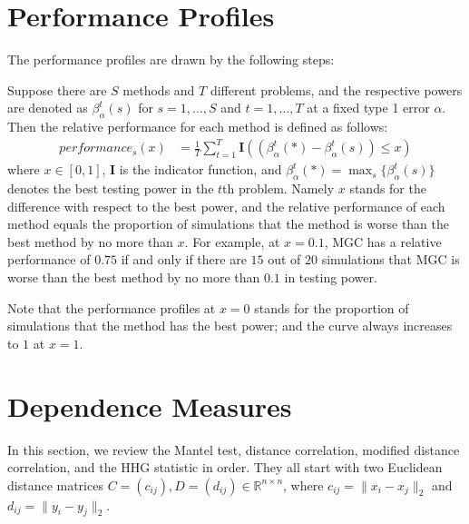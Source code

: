 \documentclass[11pt]{article}
\providecommand{\mb}[1]{\boldsymbol{#1}}
\newcommand{\Real}{\mathbb{R}}
\begin{document}
\section{Performance Profiles}
\label{appen:profiles}
The performance profiles are drawn by the following steps:

Suppose there are $S$ methods and $T$ different problems, and the respective powers are denoted as $\beta_{\alpha}^{t}(s)$ for $s=1,\ldots,S$ and $t=1,\ldots,T$ at a fixed type 1 error $\alpha$. Then the relative performance for each method is defined as follows:
\begin{align*}
performance_{s}(x) &= \frac{1}{T} \sum_{t=1}^{T} \mb{I}((\beta_{\alpha}^{t}(*)-\beta_{\alpha}^{t}(s)) \leq x)
\end{align*}
where $x \in [0,1]$, $\mb{I}$ is the indicator function, and $\beta_{\alpha}^{t}(*) =\max_{s} \{\beta_{\alpha}^{t}(s)\}$ denotes the best testing power in the $t$th problem. Namely $x$ stands for the difference with respect to the best power, and the relative performance of each method equals the proportion of simulations that the method is worse than the best method by no more than $x$. For example, at $x=0.1$, MGC has a relative performance of $0.75$ if and only if there are $15$ out of $20$ simulations that MGC is worse than the best method by no more than $0.1$ in testing power. 

Note that the performance profiles at $x=0$ stands for the proportion of simulations that the method has the best power; and the curve always increases to $1$ at $x=1$. 

\section{Dependence Measures}
\label{appen:methods}

In this section, we review the Mantel test, distance correlation, modified distance correlation, and the HHG statistic in order. They all start with two Euclidean distance matrices $C=(c_{ij}), D=(d_{ij}) \in \Real^{n \times n}$, where $c_{ij}=\|x_{i}-x_{j}\|_{2}$ and $d_{ij}=\|y_{i}-y_{j}\|_{2}$. 
\end{document}
